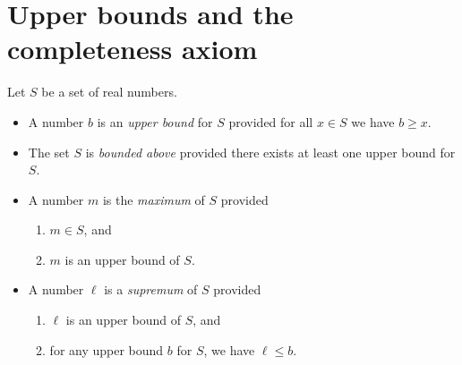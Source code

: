 \documentclass[12pt]{amsart}
\begin{document}
	
	\thispagestyle{empty}
	
	\section*{Upper bounds and the completeness axiom}
	
	

\begin{framed}
Let $S$ be a set of real numbers. 
\begin{itemize}
\item A number $b$ is an \emph{upper bound} for $S$ provided for all $x\in S$ we have $b\geq x$. 
\item The set $S$ is \emph{bounded above} provided there exists at least one upper bound for $S$.
\item A number $m$ is the \emph{maximum} of $S$ provided
\begin{enumerate}
\item $m\in S$, and
\item $m$ is an upper bound of $S$.
\end{enumerate}
\item A number $\ell$ is a \emph{supremum} of $S$ provided
\begin{enumerate}
\item $\ell$ is an upper bound of $S$, and
\item for any upper bound $b$ for $S$, we have $\ell \leq b$.
\end{enumerate}
\end{itemize}
\end{framed}

\
\end{document}
